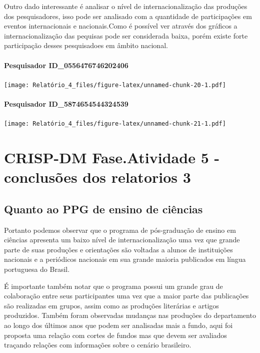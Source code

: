 \documentclass[]{article}
\let\oldparagraph\paragraph
\renewcommand{\paragraph}[1]{\oldparagraph{#1}\mbox{}}
\begin{document}
Outro dado interessante é analisar o nível de internacionalização das
produções dos pesquisadores, isso pode ser analisado com a quantidade de
participações em eventos internacionais e nacionais.Como é possível ver
através dos gráficos a internacionalização das pequisas pode ser
considerada baixa, porém existe forte participação desses pesquisadoes
em âmbito nacional.

\paragraph{Pesquisador
ID\_0556476746202406}\label{pesquisador-id_0556476746202406}

\texttt{[image: Relatório\_4\_files/figure-latex/unnamed-chunk-20-1.pdf]}

\paragraph{Pesquisador
ID\_5874654544324539}\label{pesquisador-id_5874654544324539}

\texttt{[image: Relatório\_4\_files/figure-latex/unnamed-chunk-21-1.pdf]}

\section{CRISP-DM Fase.Atividade 5 - conclusões dos relatorios
3}\label{crisp-dm-fase.atividade-5---conclusoes-dos-relatorios-3}

\subsection{Quanto ao PPG de ensino de
ciências}\label{quanto-ao-ppg-de-ensino-de-ciencias}

Portanto podemos observar que o programa de pós-graduação de ensino em
ciências apresenta um baixo nível de internacionalização uma vez que
grande parte de suas produções e orientações são voltadas a alunos de
instituições nacionais e a periódicos nacionais em sua grande maioria
publicados em língua portuguesa do Brasil.

É importante também notar que o programa possui um grande grau de
colaboração entre seus participantes uma vez que a maior parte das
publicações são realizadas em grupos, assim como as produções literárias
e artigos produzidos. Também foram observadas mudanças nas produções do
departamento ao longo dos últimos anos que podem ser analisadas mais a
fundo, aqui foi proposta uma relação com cortes de fundos mas que devem
ser avaliados traçando relações com informações sobre o cenário
brasileiro.
\end{document}
